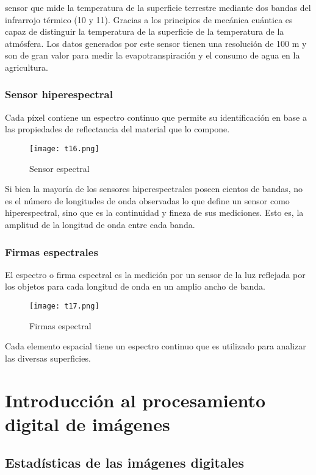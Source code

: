 sensor que mide la temperatura de la superficie terrestre mediante dos bandas del infrarrojo térmico (10 y 11). Gracias a los principios de mecánica cuántica es capaz de distinguir la temperatura de la superficie de la temperatura de la atmósfera. Los datos generados por este sensor tienen una resolución de 100 m y son de gran valor para medir la evapotranspiración y el consumo de agua en la agricultura.

\subsubsection{Sensor hiperespectral}
Cada píxel contiene un espectro continuo que permite su identificación en base a las propiedades de reflectancia del material que lo compone.

\begin{figure}[h!]
\centering
  \texttt{[image: t16.png]}
  \caption{Sensor espectral}
  \label{t16}
\end{figure}

Si bien la mayoría de los sensores hiperespectrales poseen cientos de bandas, no es el número de longitudes de onda observadas lo que define un sensor como hiperespectral, sino que es la continuidad y fineza de sus mediciones. Esto es, la amplitud de la longitud de onda entre cada banda. 

\subsubsection{Firmas espectrales}

El espectro o firma espectral es la medición por un sensor de la luz reflejada por los objetos para cada longitud de onda en un amplio ancho de banda. 
\begin{figure}[h!]
  \centering
    \texttt{[image: t17.png]}
    \caption{Firmas espectral}
    \label{t17}
  \end{figure}
Cada elemento espacial tiene un espectro continuo que es utilizado para analizar las diversas superficies. 

\section{Introducción al procesamiento digital de imágenes}

\subsection{Estadísticas de las imágenes digitales}

